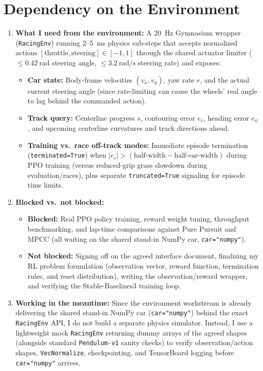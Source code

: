 \documentclass[11pt]{article}
\begin{document}
\section{Dependency on the Environment}
\begin{enumerate}[leftmargin=1.5em, itemsep=0.25em]
    \item \textbf{What I need from the environment:} A 20~Hz Gymnasium wrapper (\texttt{RacingEnv}) running 2--5~ms physics sub-steps that accepts normalized actions $[\text{throttle}, \text{steering}] \in [-1, 1]$ through the shared actuator limiter ($\le 0.42~\text{rad}$ steering angle, $\le 3.2~\text{rad/s}$ steering rate) and exposes:
    \begin{itemize}[leftmargin=1.5em, itemsep=0.15em]
        \item \textbf{Car state:} Body-frame velocities $(v_x, v_y)$, yaw rate $r$, and the actual current steering angle (since rate-limiting can cause the wheels' real angle to lag behind the commanded action).
        \item \textbf{Track query:} Centerline progress $s$, contouring error $e_c$, heading error $e_\psi$, and upcoming centerline curvatures and track directions ahead.
        \item \textbf{Training vs.\ race off-track modes:} Immediate episode termination (\texttt{terminated=True}) when $|e_c| > (\text{half-width} - \text{half-car-width})$ during PPO training (versus reduced-grip grass slowdown during evaluation/races), plus separate \texttt{truncated=True} signaling for episode time limits.
    \end{itemize}
    \item \textbf{Blocked vs.\ not blocked:} 
    \begin{itemize}[leftmargin=1.5em, itemsep=0.15em]
        \item \textbf{Blocked:} Real PPO policy training, reward weight tuning, throughput benchmarking, and lap-time comparisons against Pure Pursuit and MPCC (all waiting on the shared stand-in NumPy car, \texttt{car="numpy"}).
        \item \textbf{Not blocked:} Signing off on the agreed interface document, finalizing my RL problem formulation (observation vector, reward function, termination rules, and reset distribution), writing the observation/reward wrapper, and verifying the Stable-Baselines3 training loop.
    \end{itemize}
    \item \textbf{Working in the meantime:} Since the environment workstream is already delivering the shared stand-in NumPy car (\texttt{car="numpy"}) behind the exact \texttt{RacingEnv} API, I do not build a separate physics simulator. Instead, I use a lightweight mock \texttt{RacingEnv} returning dummy arrays of the agreed shapes (alongside standard \texttt{Pendulum-v1} sanity checks) to verify observation/action shapes, \texttt{VecNormalize}, checkpointing, and TensorBoard logging before \texttt{car="numpy"} arrives.

\end{enumerate}
\end{document}
